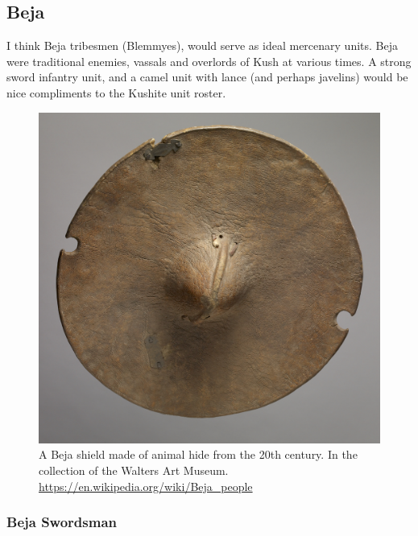 \documentclass[a4paper,12pt]{scrreprt}
\begin{document}
\subsection{Beja}

I think Beja tribesmen (Blemmyes), would serve as ideal mercenary units. Beja were traditional enemies, vassals and overlords of Kush at various times. A strong sword infantry unit, and a camel unit with lance (and perhaps javelins) would be nice compliments to the Kushite unit roster.

\begin{figure}[H]
	\centering
	\includegraphics[width=\textwidth]{img/beja/Beja_Shield}
	\caption{A Beja shield made of animal hide from the 20th century. In the collection of the Walters Art Museum. \url{https://en.wikipedia.org/wiki/Beja_people}}
\end{figure}

\subsubsection{Beja Swordsman}
\end{document}
